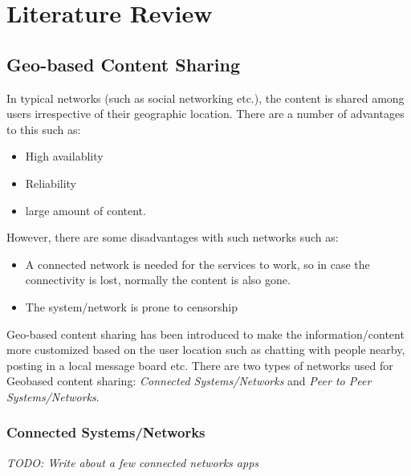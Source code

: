 
\chapter{Literature Review}\label{chapter:literature_review}

\section{Geo-based Content Sharing}
In typical networks (such as social networking etc.), the content is shared among users irrespective of their geographic location. There are a number of advantages to this such as:

\begin{itemize}
  \item High availablity
  \item Reliability
  \item large amount of content. 
\end{itemize}

However, there are some disadvantages with such networks such as:

\begin{itemize}
  \item A connected network is needed for the services to work, so in case the connectivity is lost, normally the content is also gone.
  \item The system/network is prone to censorship
\end{itemize}

Geo-based content sharing has been introduced to make the information/content more customized based on the user location such as chatting with people nearby, posting in a local message board etc. There are two types of networks used for Geobased content sharing: \emph{Connected Systems/Networks} and \emph{Peer to Peer Systems/Networks}.

\subsection{Connected Systems/Networks}
\textit{TODO: Write about a few connected networks apps}

